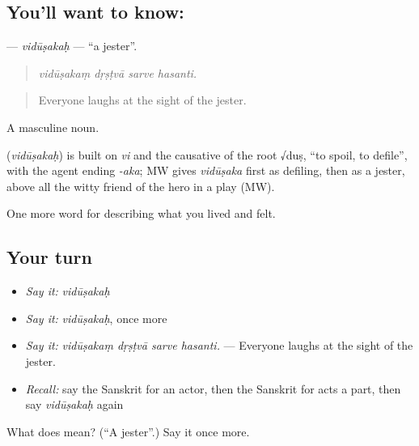 \subsection*{You'll want to know: }
\textbf{} — \emph{vidūṣakaḥ} — \textquotedblleft{}a jester\textquotedblright{}.

\begin{quote}
   
\end{quote}

\begin{quote}
\emph{vidūṣakaṃ dṛṣṭvā sarve hasanti.}
\end{quote}

\begin{quote}
Everyone laughs at the sight of the jester.
\end{quote}

A masculine noun.

\begin{cousinweb}
\textbf{} (\emph{vidūṣakaḥ}) is built on \emph{vi} and the causative of the root √duṣ, \textquotedblleft{}to spoil, to defile\textquotedblright{}, with the agent ending \emph{-aka}; MW gives \emph{vidūṣaka} first as defiling, then as a jester, above all the witty friend of the hero in a play (MW).
\end{cousinweb}

\begin{grammarlens}[title={What you've built}]
One more word for describing what you lived and felt.
\end{grammarlens}

\subsection*{Your turn}
\begin{itemize}
\raggedright
  \item \emph{Say it:} \emph{vidūṣakaḥ}
  \item \emph{Say it:} \emph{vidūṣakaḥ}, once more
  \item \emph{Say it:} \emph{vidūṣakaṃ dṛṣṭvā sarve hasanti.} — Everyone laughs at the sight of the jester.
  \item \emph{Recall:} say the Sanskrit for an actor, then the Sanskrit for acts a part, then say \emph{vidūṣakaḥ} again
\end{itemize}

\begin{tcolorbox}[breakable,colback=teal!4,colframe=teal!35!black,title={Before you move on}]
What does  mean? (\textquotedblleft{}A jester\textquotedblright{}.) Say it once more.
\end{tcolorbox}
